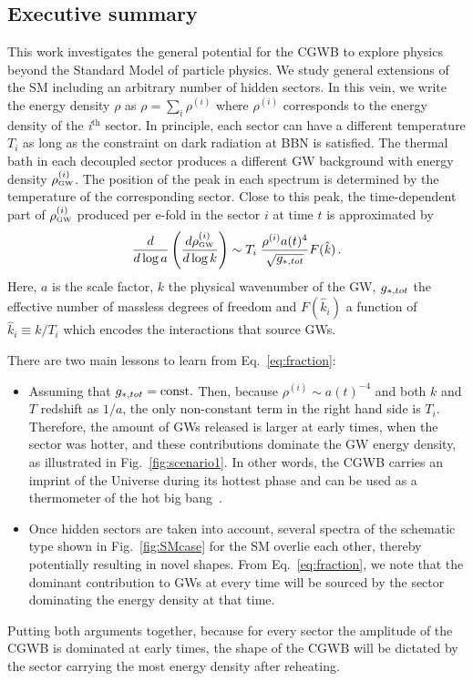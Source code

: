 \documentclass[a4paper,11pt]{article}
\DeclareMathOperator{\hk}{\hat{\mathit{k}}}
\newcommand{\dof}[1]{g_{*,\tiny{#1}}}
\newcommand{\lr}[1]{\left(#1\right)}
\newcommand{\tti}[1]{\text{\tiny{#1}}}
\begin{document}
\subsection{Executive summary}\label{sec:ExecutiveSummary}

This work investigates the general potential for the CGWB to explore physics beyond the Standard Model of particle physics. 
We study general extensions of the SM including an arbitrary number of hidden sectors. In this vein, we write the energy density $\rho$ as $\rho = \sum_i \rho^{(i)}$ where $\rho^{(i)}$ corresponds to the energy density of the \textit{i}$^\text{th}$ sector.
In principle, each sector can have a different temperature $T_i$ as long as the constraint on dark radiation at BBN is satisfied.
The thermal bath in each decoupled sector produces a different GW background with energy density $\rho^{(i)}_{\text{\tiny{GW}}}$.
The position of the peak in each spectrum is determined by the temperature of the corresponding sector. Close to this peak, the time-dependent part of $\rho^{(i)}_{\tti{GW}}$ produced per e-fold in the sector $i$ at time $t$ is approximated by
\begin{equation}\label{eq:fraction}
    \frac{d}{d\log a}\lr{\frac{d \rho^{(i)}_{\tti{GW}}}{d \log k}} \sim T_i \; \frac{\rho^{(i)}a(t)^4}{\sqrt{\dof{tot}}}F(\hk)\,.
\end{equation}
Here, $a$ is the scale factor, $k$ the physical wavenumber of the GW, $g_{*, \tiny{tot}}$ the effective number of massless degrees of freedom and $F(\hat{k}_i)$ a function of $\hat{k}_i\equiv k/T_i$ which encodes the interactions that source GWs.

There are two main lessons to learn from Eq.~\eqref{eq:fraction}:
\begin{itemize}
    \item Assuming  that $g_{*, \tiny{tot}}=\text{const.}$ 
    Then, because $\rho^{(i)}\sim a(t)^{-4}$ and both $k$ and $T$ redshift as $1/a$, the only non-constant term in the right hand side is $T_i$. 
    Therefore, the amount of GWs released is larger at early times, when the sector was hotter, and these contributions dominate the GW energy density, as illustrated in Fig.~\ref{fig:scenario1}. 
    In other words, the CGWB carries an imprint of the Universe during its hottest phase and can be used as a thermometer of the hot big bang~\cite{Ringwald:2020ist}.
    \item Once hidden sectors are taken into account, several spectra of the schematic type shown in Fig.~\ref{fig:SMcase} for the SM overlie each other, thereby potentially resulting in novel shapes. 
    From Eq.~\eqref{eq:fraction}, we note that the dominant contribution to GWs at every time will be sourced by the sector dominating the energy density at that time. 
\end{itemize}
Putting both arguments together, because for every sector the amplitude of the CGWB is dominated at early times, the shape of the CGWB will be dictated by the sector carrying the most energy density after reheating.
\end{document}
